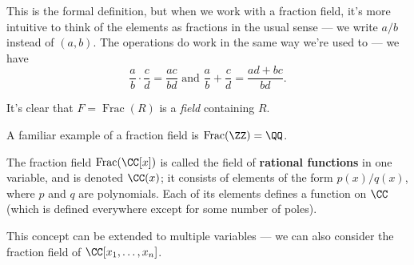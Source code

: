
This is the formal definition, but when we work with a fraction field, it's more intuitive to think of the elements as fractions in the usual sense --- we write $a/b$ instead of $(a, b)$. The operations do work in the same way we're used to --- we have \[\frac{a}{b}\cdot \frac{c}{d} = \frac{ac}{bd} \text{ and } \frac{a}{b} + \frac{c}{d} = \frac{ad + bc}{bd}.\] 

It's clear that $F = \operatorname{Frac}(R)$ is a \emph{field} containing $R$. 


\begin{example}
A familiar example of a fraction field is $\operatorname{Frac}(\ZZ) = \QQ$.
\end{example}


\begin{example}
The fraction field $\operatorname{Frac}(\CC[x])$ is called the field of \textbf{rational functions} in one variable, and is denoted $\CC(x)$; it consists of elements of the form $p(x)/q(x)$, where $p$ and $q$ are polynomials. Each of its elements defines a function on $\CC$ (which is defined everywhere except for some number of poles). 

This concept can be extended to multiple variables --- we can also consider the fraction field of $\CC[x_1, \ldots, x_n]$. 

\end{example}


